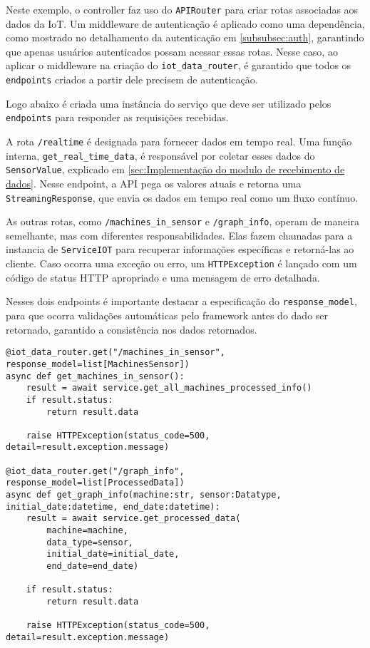 Neste exemplo, o controller faz uso do \texttt{APIRouter} para criar rotas associadas aos dados da IoT. Um middleware de autenticação é aplicado como uma dependência, como mostrado no detalhamento da autenticação em \ref{subsubsec:auth}, garantindo que apenas usuários autenticados possam acessar essas rotas. Nesse caso, ao aplicar o middleware na criação do \texttt{iot\_data\_router}, é garantido que todos os \texttt{endpoints} criados a partir dele precisem de autenticação.

Logo abaixo é criada uma instância do serviço que deve ser utilizado pelos \texttt{endpoints} para responder as requisições recebidas.

A rota \texttt{/realtime} é designada para fornecer dados em tempo real. Uma função interna, \texttt{get\_real\_time\_data}, é 
responsável por coletar esses dados do \texttt{SensorValue}, explicado em \ref{sec:Implementação do modulo de recebimento de dados}. Nesse endpoint, a \gls{API} pega os valores atuais e retorna uma \texttt{StreamingResponse}, que envia os dados em tempo real como um fluxo contínuo.

As outras rotas, como \texttt{/machines\_in\_sensor} e \texttt{/graph\_info}, operam de maneira semelhante, mas com diferentes responsabilidades. Elas fazem chamadas para a instancia de \texttt{ServiceIOT} para recuperar informações específicas e retorná-las ao cliente. Caso ocorra uma exceção ou erro, um \texttt{HTTPException} é lançado com um código de status HTTP apropriado e uma mensagem de erro detalhada.

Nesses dois endpoints é importante destacar a especificação do \texttt{response\_model}, para que ocorra validações automáticas pelo framework antes do dado ser retornado, garantido a consistência nos dados retornados.

\begin{verbatim}
@iot_data_router.get("/machines_in_sensor", response_model=list[MachinesSensor])
async def get_machines_in_sensor():
    result = await service.get_all_machines_processed_info()
    if result.status:
        return result.data
    
    raise HTTPException(status_code=500, detail=result.exception.message)

@iot_data_router.get("/graph_info", response_model=list[ProcessedData])
async def get_graph_info(machine:str, sensor:Datatype, initial_date:datetime, end_date:datetime):
    result = await service.get_processed_data(
        machine=machine,
        data_type=sensor,
        initial_date=initial_date,
        end_date=end_date)
    
    if result.status:
        return result.data
    
    raise HTTPException(status_code=500, detail=result.exception.message)
\end{verbatim}


